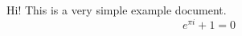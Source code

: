 \documentclass{article}
\begin{document}
Hi! This is a very simple example document.
\[e^{\pi i} + 1 = 0\]
\end{document}
